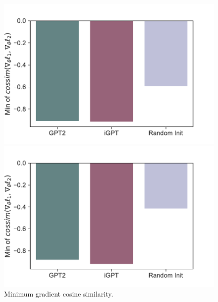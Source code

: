 \documentclass{article}
\begin{document}
\begin{figure}[H]
    \centering
    \begin{minipage}[b]{0.48\linewidth}
        \includegraphics[width=\linewidth]{figs/mingradcossim_1_gpt2_igpt_dt_halfcheetah_medium_666.pdf}
    \end{minipage}
    \begin{minipage}[b]{0.48\linewidth}
        \includegraphics[width=\linewidth]{figs/mingradcossim_1_gpt2_igpt_dt_walker2d_medium_666.pdf}
    \end{minipage}
    \caption{Minimum gradient cosine similarity.}
\end{figure}
\end{document}
